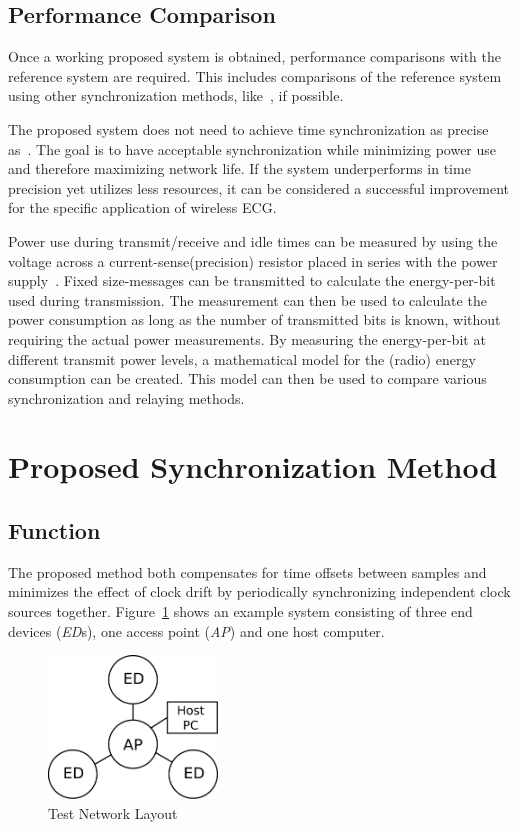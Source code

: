 \documentclass{article}
\begin{document}
\subsection{Performance Comparison}\label{subsection:performance}
Once a working proposed system is obtained, performance comparisons with the reference system are required. This includes comparisons of the reference system using other synchronization methods, like~\cite{synchronization:FTSP}, if possible.

The proposed system does not need to achieve time synchronization as precise as~\cite{synchronization:FTSP}. The goal is to have acceptable synchronization while minimizing power use and therefore maximizing network life. If the system underperforms in time precision yet utilizes less resources, it can be considered a successful improvement for the specific application of wireless ECG.

Power use during transmit/receive and idle times can be measured by using the voltage across a current-sense(precision) resistor placed in series with the power supply~\cite{mac:lowdutycycle}. Fixed size-messages can be transmitted to calculate the energy-per-bit used during transmission. The measurement can then be used to calculate the power consumption as long as the number of transmitted bits is known, without requiring the actual power measurements. By measuring the energy-per-bit at different transmit power levels, a mathematical model for the (radio) energy consumption can be created. This model can then be used to compare various synchronization and relaying methods.

\section{Proposed Synchronization Method}\label{section:synchronization}

\subsection{Function}
The proposed method both compensates for time offsets between samples and minimizes the effect of clock drift by periodically synchronizing independent clock sources together. Figure~\ref{fig:network_layout} shows an example system consisting of three end devices (\emph{ED}s), one access point (\emph{AP}) and one host computer. 
\begin{figure}[htb]
\begin{center}
\includegraphics[width=0.4\textwidth]{figures/network-map-test2.pdf}
\end{center}
\caption{Test Network Layout}
\label{fig:network_layout}
\end{figure}
\end{document}
